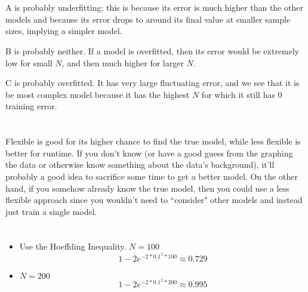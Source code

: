 \documentclass[12pt]{article}
\begin{document}
\section{}
A is probably underfitting; this is because its error is much higher than the other models and because its error drops to around its final value at smaller sample sizes, implying a simpler model.

B is probably neither. If a model is overfitted, then its error would be extremely low for small $ N $, and then much higher for larger $ N $.

C is probably overfitted. It has very large fluctuating error, and we see that it is be most complex model because it has the highest $ N $ for which it still has 0 training error.
\newpage

\section{}
Flexible is good for its higher chance to find the true model, while less flexible is better for runtime. If you don't know (or have a good guess from the graphing the data or otherwise know something about the data's background), it'll probably a good idea to sacrifice some time to get a better model. On the other hand, if you somehow already know the true model, then you could use a less flexible approach since you wouldn't need to ``consider" other models and instead just train a single model.
\newpage

\section{}
\begin{itemize}
	\item Use the Hoeffding Inequality. $ N = 100 $
	\[ 1 - 2e^{-2*0.1^2*100} \approx 0.729 \]
	
	\item $ N = 200 $
	\[ 1 - 2e^{-2*0.1^2*200} \approx 0.995 \]
\end{itemize}
\newpage
\end{document}
